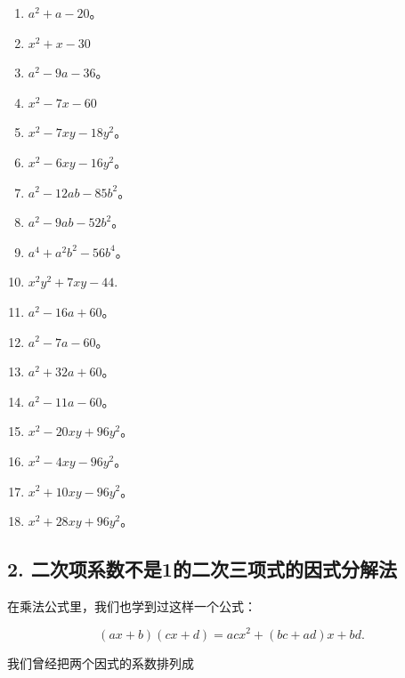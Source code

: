 \begin{enumerate}[start=3]
\item
  \(a^2 + a - 20\)。
\item
  \(x^{2} + x - 30\)
\item
  \(a^2 - 9a - 36\)。
\item
  \(x^{2} - 7x - 60\)
\item
  \(x^{2} - 7xy - 18y^{2}\)。
\item
  \(x^{2} - 6xy - 16y^{2}\)。
\item
  \(a^2 - 12ab - 85b^2\)。
\item
  \(a^2 - 9ab - 52b^2\)。
\item
  \(a^4 + a^2 b^2 - 56b^4\)。
\item
  \(x^{2}y^{2} + 7xy - 44.\)
\item
  \(a^2 - 16a + 60\)。
\item
  \(a^2 - 7a - 60\)。
\item
  \(a^2 + 32a + 60\)。
\item
  \(a^2 - 11a - 60\)。
\item
  \(x^{2} - 20xy + 96y^{2}\)。
\item
  \(x^{2} - 4xy - 96y^{2}\)。
\item
  \(x^{2} + 10xy - 96y^{2}\)。
\item
  \(x^{2} + 28xy + 96y^{2}\)。
\end{enumerate}

\subsection{2. 二次项系数不是1的二次三项式的因式分解法}

在乘法公式里，我们也学到过这样一个公式：

\[
(a x + b) (c x + d) = a c x ^{2} + (b c + a d) x + b d.
\]

我们曾经把两个因式的系数排列成

\begin{figure}
\centering
\end{figure}

